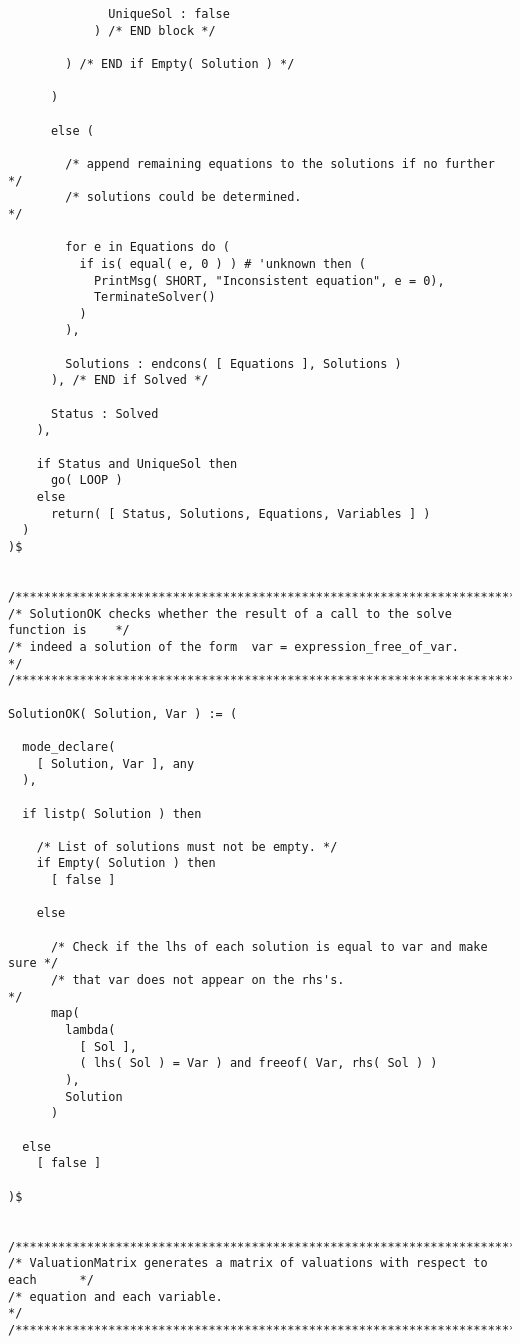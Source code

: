 \begin{verbatim}
              UniqueSol : false
            ) /* END block */

        ) /* END if Empty( Solution ) */

      )

      else (

        /* append remaining equations to the solutions if no further */
        /* solutions could be determined.                            */

        for e in Equations do (
          if is( equal( e, 0 ) ) # 'unknown then (
            PrintMsg( SHORT, "Inconsistent equation", e = 0),
            TerminateSolver()
          )
        ),

        Solutions : endcons( [ Equations ], Solutions )
      ), /* END if Solved */

      Status : Solved
    ),

    if Status and UniqueSol then
      go( LOOP )
    else
      return( [ Status, Solutions, Equations, Variables ] )
  )
)$


/******************************************************************************/
/* SolutionOK checks whether the result of a call to the solve function is    */
/* indeed a solution of the form  var = expression_free_of_var.               */
/******************************************************************************/

SolutionOK( Solution, Var ) := (

  mode_declare(
    [ Solution, Var ], any
  ),

  if listp( Solution ) then

    /* List of solutions must not be empty. */
    if Empty( Solution ) then
      [ false ]

    else

      /* Check if the lhs of each solution is equal to var and make sure */
      /* that var does not appear on the rhs's.                          */
      map(
        lambda(
          [ Sol ],
          ( lhs( Sol ) = Var ) and freeof( Var, rhs( Sol ) )
        ),
        Solution
      )

  else
    [ false ]

)$


/******************************************************************************/
/* ValuationMatrix generates a matrix of valuations with respect to each      */
/* equation and each variable.                                                */
/******************************************************************************/


\end{verbatim}
